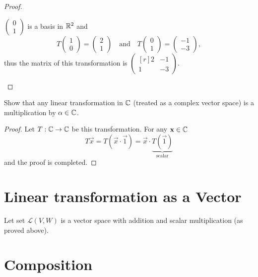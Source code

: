 \begin{proof}
\begin{enumerate}
\begin{itemize}
          $\begin{pmatrix} 0\\1 \end{pmatrix}$ is a basis in $\mathbb{R}^2$ and
          \[
            T\begin{pmatrix} 1\\0 \end{pmatrix}=\begin{pmatrix} 2\\1 \end{pmatrix}
            \quad\text{and}\quad
            T\begin{pmatrix} 0\\1 \end{pmatrix}=\begin{pmatrix} -1\\-3 \end{pmatrix},
          \]
          thus the matrix of this transformation is 
          $ \begin{pmatrix*}[r] 2 & -1\\1&-3 \end{pmatrix*} $.
      \end{itemize}
  \end{enumerate}
\end{proof}
\begin{exercise}
  Show that any linear transformation in $\mathbb{C}$ 
  (treated as a complex vector space) is a multiplication by 
  $\alpha\in\mathbb{C}$.
\end{exercise}
\begin{proof}
  Let $T:\mathbb{C}\to\mathbb{C}$ be this transformation. For any $\mathbf{x}\in\mathbb{C}$
  \[
    T\vec{x}=T(\vec{x}\cdot \vec{1})=\vec{x}\cdot \underbrace{T(\vec{1})}_{\text{scalar}}
  \]
  and the proof is completed.
\end{proof}
\section{Linear transformation as a Vector}
Let set $\mathcal{L}(V,W)$ is a vector space with addition and scalar 
multiplication (as proved above).
\section{Composition}

